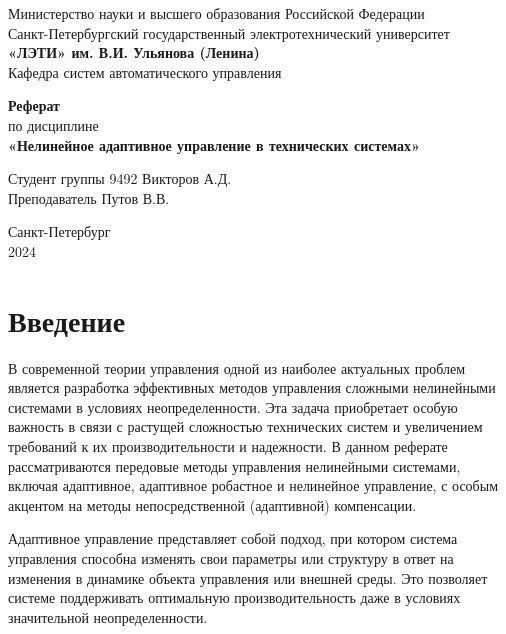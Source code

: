 \documentclass[a4paper,14pt]{extarticle} %
\begin{document}
\begin{titlepage}
    \begin{center}
        \large
        Министерство науки и высшего образования Российской Федерации \\
        Санкт-Петербургский государственный электротехнический университет \\
        \textbf{«ЛЭТИ» им. В.И. Ульянова (Ленина)} \\
        Кафедра систем автоматического управления

        \vfill

        \textbf{Реферат} \\
        по дисциплине \\
        \textbf{«Нелинейное адаптивное управление в технических системах»}

        \vfill

        Студент группы 9492 \hfill Викторов А.Д. \\
        Преподаватель \hfill Путов В.В.

        \vfill
        Санкт-Петербург \\
        2024
    \end{center}
\end{titlepage}

\setcounter{page}{2}
\tableofcontents

\newpage

\section{Введение}

В современной теории управления одной из наиболее актуальных проблем является разработка эффективных методов управления сложными нелинейными системами в условиях неопределенности. Эта задача приобретает особую важность в связи с растущей сложностью технических систем и увеличением требований к их производительности и надежности. В данном реферате рассматриваются передовые методы управления нелинейными системами, включая адаптивное, адаптивное робастное и нелинейное управление, с особым акцентом на методы непосредственной (адаптивной) компенсации.

Адаптивное управление представляет собой подход, при котором система управления способна изменять свои параметры или структуру в ответ на изменения в динамике объекта управления или внешней среды. Это позволяет системе поддерживать оптимальную производительность даже в условиях значительной неопределенности.
\end{document}
